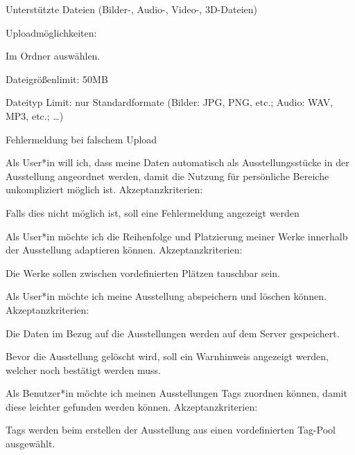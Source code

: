 \begin{compactenum}
    \begin{compactitem}
        \item Unterstützte Dateien (Bilder-, Audio-, Video-, 3D-Dateien)
        \item Uploadmöglichkeiten:
        \begin{compactitem}
            \item Im Ordner auswählen.
        \end{compactitem}
        \item Dateigrößenlimit: 50MB
        \item Dateityp Limit: nur Standardformate (Bilder: JPG, PNG, etc.;        Audio: WAV, MP3, etc.; …)
        \item Fehlermeldung bei falschem Upload
    \end{compactitem}
    \item  Als User*in will ich, dass meine Daten automatisch als Ausstellungsstücke in der Ausstellung angeordnet werden, damit die Nutzung für persönliche Bereiche unkompliziert möglich ist. Akzeptanzkriterien:
    \begin{compactitem}
        \item Falls dies nicht möglich ist, soll eine Fehlermeldung angezeigt werden
    \end{compactitem}
    \item Als User*in möchte ich die Reihenfolge und Platzierung meiner Werke innerhalb der Ausstellung adaptieren können. Akzeptanzkriterien:
    \begin{compactitem}
        \item Die Werke sollen zwischen vordefinierten Plätzen tauschbar sein.
    \end{compactitem}
    \item Als User*in möchte ich meine Ausstellung abspeichern und löschen können. Akzeptanzkriterien:
    \begin{compactitem}
        \item Die Daten im Bezug auf die Ausstellungen werden auf dem Server gespeichert.
        \item Bevor die Ausstellung gelöscht wird, soll ein Warnhinweis angezeigt werden, welcher noch bestätigt werden muss.
    \end{compactitem}
    \item Als Benutzer*in möchte ich meinen Ausstellungen Tags zuordnen können, damit diese leichter gefunden werden können. Akzeptanzkriterien:
    \begin{compactitem}
        \item Tags werden beim erstellen der Ausstellung aus einen vordefinierten Tag-Pool ausgewählt.
    \end{compactitem}
\end{compactenum}
 








